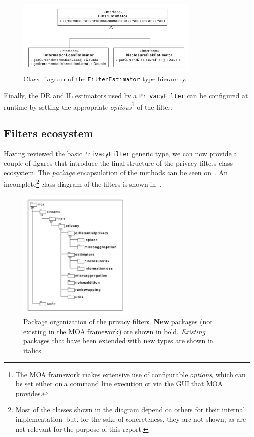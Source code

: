 \begin{figure}[h]
	\centering
	\includegraphics[width=0.8\textwidth]{figures/class_Estimators.pdf}
	\caption[\texttt{FilterEstimator} type hierarchy diagram.]{Class diagram of the \texttt{FilterEstimator} type hierarchy.}
	\label{fig:estimators-uml}
\end{figure}

Finally, the DR and IL estimators used by a \texttt{PrivacyFilter} can be configured at runtime by setting the appropriate \textit{options}\footnote{The MOA framework makes extensive use of configurable \textit{options}, which can be set either on a command line execution or via the GUI that MOA provides.} of the filter.

\subsection{Filters ecosystem}
\label{Implementation:PrivacyFilter:Ecosystem}

Having reviewed the basic \texttt{PrivacyFilter} generic type, we can now provide a couple of figures that introduce the final structure of the privacy filters class ecosystem. The \textit{package} encapsulation of the methods can be seen on~. An incomplete\footnote{Most of the classes shown in the diagram depend on others for their internal implementation, but, for the sake of concreteness, they are not shown, as are not relevant for the purpose of this report.} class diagram of the filters is shown in~.

\begin{figure}
	\centering
	\includegraphics[width=0.5\textwidth]{figures/moa-ppsm-packages.pdf}
	\caption[Package diagram of the privacy filters ecosystem.]{Package organization of the privacy filters. \textbf{New} packages (not existing in the MOA framework) are shown in bold. \textit{Existing} packages that have been extended with new types are shown in italics.}
	\label{fig:moa-ppsm-packages}
\end{figure}

